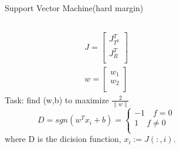 \documentclass[10pt]{beamer}
\newcommand{\norm}[1]{\left\lVert#1\right\rVert}
\begin{document}
\begin{frame}{Support Vector Machine(hard margin)}
\begin{columns}
        \begin{column}{0.5\textwidth}
           \begin{equation} \nonumber
           \begin{aligned}
               J = \begin{bmatrix}
                   J_{T^2}^T \\
                   J_R^T \\
                   \end{bmatrix} \\
                   w = \begin{bmatrix}
                        w_1 \\
                        w_2 \\
                       \end{bmatrix}
           \end{aligned}
           \end{equation}
           Task: find (w,b) to maximize $\frac{2}{\norm{w}}$
           \begin{equation} \nonumber
           D = sgn(w^Tx_i+b) = 
           \left\{  \begin{aligned} -1 \quad f = 0  \\
                                     1 \quad f \neq 0  \\   
                    \end{aligned}   
           \right.
           \end{equation}
           where D is the dicision function, $x_i:=J(:,i)$.
        \end{column}
        \begin{column}{0.5\textwidth}  %
            \begin{figure}[!htb] 
                \centering 
\end{figure}
\end{column}
\end{columns}
\end{frame}
\end{document}
